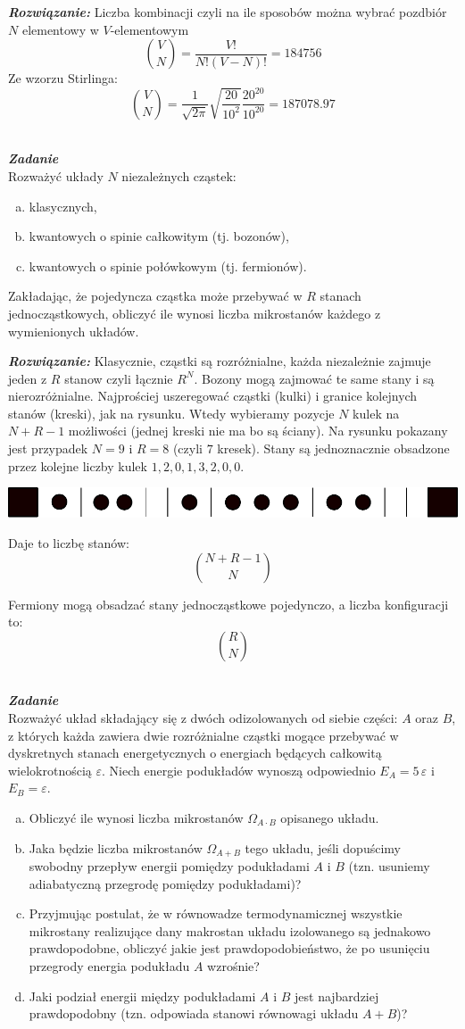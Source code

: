 \documentclass[11pt,a4paper]{article}
\newcounter{zadanie}\newcommand{\zadanie}[1][]{\addtocounter{zadanie}{1} ~\\  {\bf \emph{Zadanie \arabic{zadanie} #1 }} \\}
\begin{document}
{\bf \em Rozwiązanie:} Liczba kombinacji czyli na ile sposobów można wybrać pozdbiór $N$ elementowy w $V$-elementowym
\[
\binom{V}{N}=\frac{V!}{N!(V-N)!}=184756
\]
Ze wzorzu Stirlinga:
\[
\binom{V}{N}=\frac{1}{\sqrt{2\pi}}\sqrt{\frac{20}{10^2}}\frac{20^{20}}{10^{20}}=187078.97
\]

\zadanie
Rozważyć układy $N$ niezależnych cząstek:\begin{enumerate}[a)]
\item klasycznych,
\item kwantowych o spinie całkowitym (tj. bozonów),
\item kwantowych o spinie połówkowym (tj. fermionów).
\end{enumerate}
Zakładając, że pojedyncza cząstka może przebywać w $R$ stanach jednocząstkowych, obliczyć ile wynosi liczba mikrostanów każdego z wymienionych układów.

{\bf \em Rozwiązanie:} Klasycznie, cząstki są rozróżnialne, każda niezależnie zajmuje jeden z $R$ stanow czyli łącznie $R^N$. Bozony mogą zajmować te same stany i są nierozróżnialne.
Najprościej uszeregować cząstki (kulki) i granice kolejnych stanów (kreski), jak na rysunku.
Wtedy wybieramy pozycje $N$ kulek na $N+R-1$ możliwości (jednej kreski nie ma bo są ściany).
Na rysunku pokazany jest przypadek $N=9$ i $R=8$ (czyli $7$ kresek). Stany są jednoznacznie obsadzone przez kolejne liczby kulek $1,2,0,1,3,2,0,0$.
\begin{center}
\includegraphics[width = 0.7\linewidth]{kulkres.pdf}
\end{center}
Daje to liczbę stanów:
\[
\binom{N+R-1}{N}
\]

Fermiony mogą obsadzać stany jednocząstkowe pojedynczo, a liczba konfiguracji to:
\[
\binom{R}{N}
\]


\zadanie
Rozważyć układ składający się z dwóch odizolowanych od siebie części: $A$ oraz $B$, 
z których każda zawiera dwie rozróżnialne cząstki mogące przebywać w dyskretnych
stanach energetycznych o energiach będących całkowitą wielokrotnością $\varepsilon$. 
Niech energie podukładów wynoszą odpowiednio $E_A = 5\,\varepsilon$ i $E_B = \varepsilon$. 
\begin{enumerate}[a)]
\item 
Obliczyć ile wynosi liczba mikrostanów $\Omega_{A \cdot B}$ opisanego układu.
\item Jaka będzie liczba mikrostanów $\Omega_{A+B}$ tego układu, jeśli dopuścimy swobodny przepływ
energii pomiędzy podukładami $A$ i $B$ (tzn. usuniemy adiabatyczną przegrodę pomiędzy podukładami)?
\item Przyjmując postulat, że w równowadze termodynamicznej 
wszystkie mikrostany realizujące dany makrostan układu izolowanego są jednakowo
prawdopodobne, obliczyć jakie jest prawdopodobieństwo, że po usunięciu przegrody
energia podukładu $A$ wzrośnie?
\item Jaki podział energii między podukładami $A$ i $B$ jest najbardziej prawdopodobny (tzn. odpowiada stanowi równowagi układu $A + B$)?
\end{enumerate}
\end{document}
